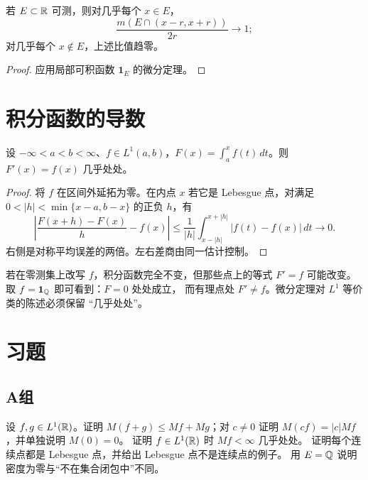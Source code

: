 \begin{corollary}\label{cor:lebesgue-density-line}
若 \(E\subset\mathbb{R}\) 可测，则对几乎每个 \(x\in E\)，
\[
 \frac{m(E\cap(x-r,x+r))}{2r}\longrightarrow1;
\]
对几乎每个 \(x\notin E\)，上述比值趋零。
\end{corollary}
\begin{proof}
应用局部可积函数 \(\mathbf1_E\) 的微分定理。
\end{proof}

\section{积分函数的导数}

\begin{theorem}\label{thm:primitive-ae-derivative}
设 \(-\infty<a<b<\infty\)、\(f\in L^1(a,b)\)，\(F(x)=\int_a^x f(t)\,dt\)。则
\(F'(x)=f(x)\) 几乎处处。
\end{theorem}
\begin{proof}
将 \(f\) 在区间外延拓为零。在内点 \(x\) 若它是 Lebesgue 点，对满足
\(0<|h|<\min\{x-a,b-x\}\) 的正负 \(h\)，有
\[
 \left|\frac{F(x+h)-F(x)}h-f(x)\right|
 \le\frac1{|h|}\int_{x-|h|}^{x+|h|}|f(t)-f(x)|\,dt\longrightarrow0.
\]
右侧是对称平均误差的两倍。左右差商由同一估计控制。
\end{proof}

若在零测集上改写 \(f\)，积分函数完全不变，但那些点上的等式 \(F'=f\)
可能改变。取 \(f=\mathbf1_{\mathbb{Q}}\) 即可看到：\(F=0\) 处处成立，
而有理点处 \(F'\ne f\)。微分定理对 \(L^1\) 等价类的陈述必须保留
“几乎处处”。

\section*{习题}
\subsection*{A组}
\begin{enumerate}[label=\textbf{\thechapter.\arabic*.}]
设 \(f,g\in L^1(\mathbb{R})\)。证明 \(M(f+g)\le Mf+Mg\)；对 \(c\ne0\) 证明 \(M(cf)=|c|Mf\)，并单独说明 \(M(0)=0\)。
证明 \(f\in L^1(\mathbb{R})\) 时 \(Mf<\infty\) 几乎处处。
证明每个连续点都是 Lebesgue 点，并给出 Lebesgue 点不是连续点的例子。
用 \(E=\mathbb{Q}\) 说明密度为零与“不在集合闭包中”不同。
\end{enumerate}
